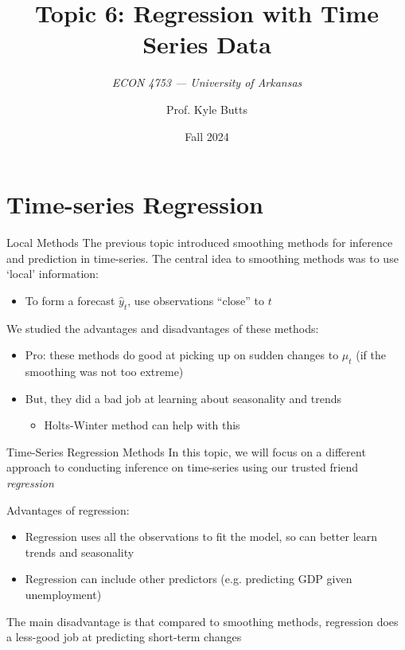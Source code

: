\documentclass[aspectratio=169,t,11pt,table]{beamer}
\title{Topic 6: Regression with Time Series Data}
\subtitle{\it  ECON 4753 — University of Arkansas}
\date{Fall 2024}
\author{Prof. Kyle Butts}
\begin{document}
\begin{frame}
\maketitle

\end{frame}

\section{Time-series Regression}

\begin{frame}{Local Methods}
  The previous topic introduced smoothing methods for inference and prediction in time-series. The central idea to smoothing methods was to use `local' information:
  \begin{itemize}
    \item To form a forecast $\hat{y}_t$, use observations ``close'' to $t$
  \end{itemize}

  \bigskip
  We studied the advantages and disadvantages of these methods: 
  \begin{itemize}
    \item Pro: these methods do good at picking up on sudden changes to $\mu_t$ (if the smoothing was not too extreme)

    \item But, they did a bad job at learning about seasonality and trends
    \begin{itemize}
      \item Holts-Winter method can help with this
    \end{itemize}
  \end{itemize}
\end{frame}

\begin{frame}{Time-Series Regression Methods}
  In this topic, we will focus on a different approach to conducting inference on time-series using our trusted friend \emph{regression}

  \bigskip
  Advantages of regression:
  \begin{itemize}
    \item Regression uses all the observations to fit the model, so can better learn trends and seasonality
    
    \item Regression can include other predictors (e.g. predicting GDP given unemployment)
  \end{itemize}

  \bigskip
  The main disadvantage is that compared to smoothing methods, regression does a less-good job at predicting short-term changes 
\end{frame}
\end{document}
